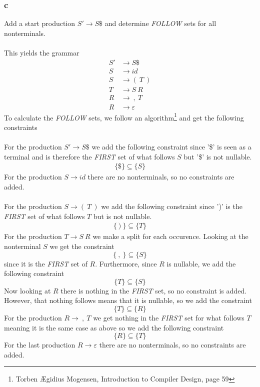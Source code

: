 \documentclass[12pt]{article}
\begin{document}
\subsubsection{c}
Add a start production $S' \rightarrow S\$$ and determine \textit{FOLLOW} sets for all nonterminals.\\
\\
This yields the grammar
\begin{align*}
S' &\rightarrow S\$ \\
S &\rightarrow id \\
S &\rightarrow (\:T\:) \\
T &\rightarrow S\:R \\
R &\rightarrow \:,\:T \\
R &\rightarrow \varepsilon
\end{align*}
To calculate the \textit{FOLLOW} sets, we follow an algorithm\footnote{Torben Ægidius Mogensen, Introduction to Compiler Design, page 59} and get the following constraints \\
\\
For the production $S' \rightarrow S\$$ we add the following constraint since '\$' is seen as a terminal and is therefore the \textit{FIRST} set of what follows $S$ but '\$' is not nullable.
\begin{align*}
\{\$\} \subseteq \{S\}
\end{align*}
For the production $S \rightarrow id$ there are no nonterminals, so no constraints are added.\\\\
For the production $S \rightarrow (\:T\:)$ we add the following constraint since ')' is the \textit{FIRST} set of what follows $T$ but is not nullable.
\begin{align*}
\{\:)\:\} \subseteq \{T\}
\end{align*}
For the production $T \rightarrow S\:R$ we make a split for each occurence. Looking at the nonterminal $S$ we get the constraint
$$ \{\:,\:\} \subseteq \{S\} $$
since it is the \textit{FIRST} set of $R$. Furthermore, since $R$ is nullable, we add the following constraint
$$ \{T\} \subseteq \{S\} $$
Now looking at $R$ there is nothing in the \textit{FIRST} set, so no constraint is added. However, that nothing follows means that it is nullable, so we add the constraint
$$ \{T\} \subseteq \{R\} $$
For the production $R \rightarrow \:,\:T$ we get nothing in the \textit{FIRST} set for what follows $T$ meaning it is the same case as above so we add the following constraint
$$ \{R\} \subseteq \{T\} $$
For the last production $R \rightarrow \varepsilon$ there are no nonterminals, so no constraints are added.\\
\end{document}

